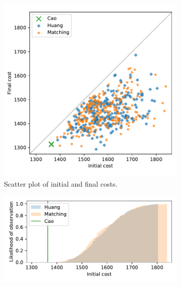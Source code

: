 \documentclass[11pt]{article}
\begin{document}
\begin{figure}
    \begin{subfigure}{.5\textwidth}
        \includegraphics[width=\linewidth]{Fig8a.pdf}
        \caption{Scatter plot of initial and final costs.}
    \end{subfigure}
    \hfill%
    \begin{subfigure}{.5\textwidth}
        \includegraphics[width=\linewidth]{Fig8b1.pdf}


\end{subfigure}
\end{figure}
\end{document}
